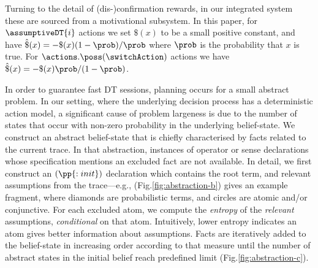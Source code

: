 Turning to the detail of (dis-)confirmation rewards, in our integrated
system these are sourced from a motivational subsystem. In this paper,
for $\assumptiveDT{i}$ actions we set $\$(x)$ to be a small positive
constant, and have $\hat\$(x)= - \$(x)(1 - \prob) /
\prob$ where $\prob$ is the probability that $x$ is true. For
$\actions.\poss(\switchAction)$ actions we have $\hat\$(x)= -
\$(x)\prob/(1-\prob)$.







In order to guarantee fast DT sessions, planning occurs for a small
abstract problem. In our setting, where the underlying decision
process has a deterministic action model, a significant cause of
problem largeness is due to the number of states that occur with
non-zero probability in the underlying belief-state. We construct an
abstract belief-state that is chiefly characterised by facts related
to the current trace. In that abstraction, instances of operator or
sense declarations whose specification mentions an excluded fact are
not available.
In detail, we first construct an $(\pp{:init})$ declaration which
contains the root term, and relevant assumptions from the trace---e.g., (Fig.\ref{fig:abstraction-b}) gives an example fragment, where
diamonds are probabilistic terms, and circles are atomic and/or
conjunctive.
For each excluded atom, we compute the {\em entropy} of the {\em
relevant}
assumptions, {\em conditional} on that atom. Intuitively, lower
entropy indicates an atom gives better information about
assumptions. Facts are iteratively added to the belief-state in
increasing order according to that measure until the number of
abstract states in the initial belief reach predefined limit (Fig.\ref{fig:abstraction-c}).

